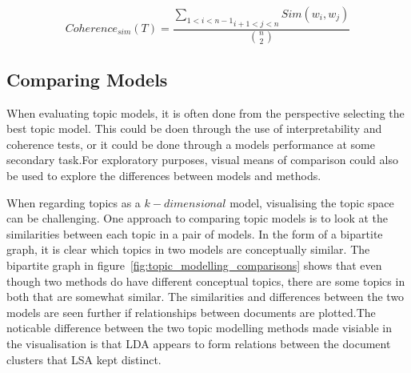 \documentclass[10pt]{report}
\begin{document}

\[
  Coherence_{sim}(T)=\frac{\underset{i+1<j<n}{\underset{1<i<n-1}{\sum}}Sim(w_i, w_j)}{{n \choose 2}}
\]
 
%


\subsection{Comparing Models}
When evaluating topic models, it is often done from the perspective selecting the best topic model. This could be doen through the use of interpretability and coherence tests, or it could be done through a models performance at some secondary task.For exploratory purposes, visual means of comparison could also be used to explore the differences between models and methods.

When regarding topics as a \(k-dimensional\) model, visualising the topic space can be challenging. One approach to comparing topic models is to look at the similarities between each topic in a pair of models. In the form of a bipartite graph, it is clear which topics in two models are conceptually similar. The bipartite graph in figure~\ref{fig:topic_modelling_comparisons} shows that even though two methods do have different conceptual topics, there are some topics in both that are somewhat similar. The similarities and differences between the two models are seen further if relationships between documents are plotted.The noticable difference between the two topic modelling methods made visiable in the visualisation is that LDA appears to form relations between the document clusters that LSA kept distinct.~\cite{Crossno2011-sn}

\renewcommand{\baselinestretch}{0.5}\normalsize
\end{document}
